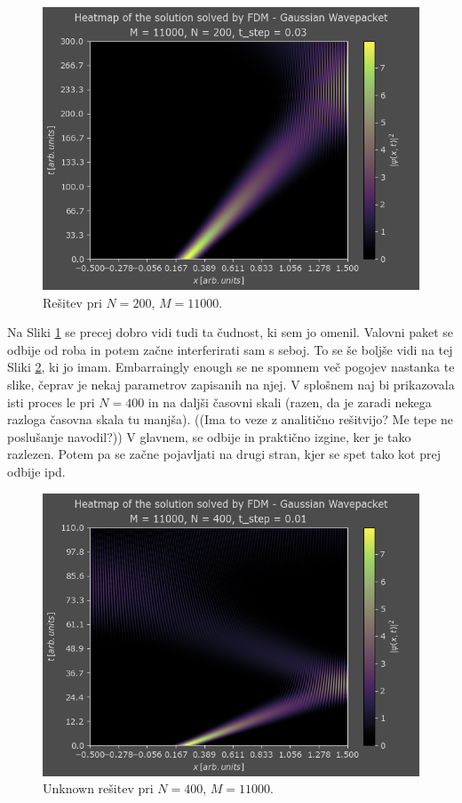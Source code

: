\documentclass[a4paper]{article}
\begin{document}
\begin{figure}[p]
    \centering
    \includegraphics[width=\textwidth]{./images/case2_N200.png}
    \caption{Rešitev pri $N=200$, $M=11000$.}
    \label{fig:gaussian_N200}
\end{figure}

Na Sliki \ref{fig:gaussian_N200} se precej dobro vidi tudi ta čudnost, ki sem jo omenil. 
Valovni paket se odbije od roba in potem začne interferirati sam s seboj. To se še boljše vidi na tej 
Sliki \ref{fig:gaussian_N400}, ki jo imam. Embarraingly enough
se ne spomnem več pogojev nastanka te slike, čeprav je nekaj parametrov zapisanih na njej. V splošnem
naj bi prikazovala isti proces le pri $N=400$ in na daljši časovni skali (razen, da je zaradi nekega 
razloga časovna skala tu manjša). ((Ima to veze z analitično rešitvijo? Me tepe ne poslušanje navodil?))
V glavnem, se odbije in praktično izgine, ker je tako razlezen. Potem pa se začne pojavljati na drugi
stran, kjer se spet tako kot prej odbije ipd.

\begin{figure}[p]
    \centering
    \includegraphics[width=\textwidth]{./images/case2_N400.png}
    \caption{Unknown rešitev pri $N=400$, $M=11000$.}
    \label{fig:gaussian_N400}
\end{figure}
\end{document}
